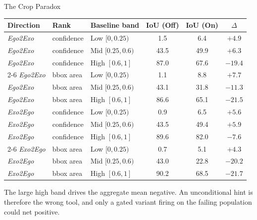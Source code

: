 \documentclass[professionalfonts,aspectratio=169]{beamer}
\begin{document}
\begin{frame}[t]
\begin{center}
{\large The Crop Paradox}
\end{center}
\vfill
\begin{center}
\footnotesize
\setlength{\tabcolsep}{5pt}
\begin{tabular}{lllccc}
  \toprule
  Direction & Rank & Baseline band & IoU (Off) & IoU (On) & $\Delta$ \\
  \midrule
  \textit{Ego2Exo} & confidence & Low $[0,0.25)$   & 1.5  & 6.4  & $+4.9$ \\
  \textit{Ego2Exo} & confidence & Mid $[0.25,0.6)$ & 43.5 & 49.9 & $+6.3$ \\
  \textit{Ego2Exo} & confidence & High $[0.6,1]$   & 87.0 & 67.6 & $-19.4$ \\
  \cmidrule(l){2-6}
  \textit{Ego2Exo} & bbox area  & Low $[0,0.25)$   & 1.1  & 8.8  & $+7.7$ \\
  \textit{Ego2Exo} & bbox area  & Mid $[0.25,0.6)$ & 43.1 & 31.8 & $-11.3$ \\
  \textit{Ego2Exo} & bbox area  & High $[0.6,1]$   & 86.6 & 65.1 & $-21.5$ \\
  \midrule
  \textit{Exo2Ego} & confidence & Low $[0,0.25)$   & 0.9  & 6.5  & $+5.6$ \\
  \textit{Exo2Ego} & confidence & Mid $[0.25,0.6)$ & 43.5 & 49.4 & $+5.9$ \\
  \textit{Exo2Ego} & confidence & High $[0.6,1]$   & 89.6 & 82.0 & $-7.6$ \\
  \cmidrule(l){2-6}
  \textit{Exo2Ego} & bbox area  & Low $[0,0.25)$   & 0.7  & 5.1  & $+4.3$ \\
  \textit{Exo2Ego} & bbox area  & Mid $[0.25,0.6)$ & 43.0 & 22.8 & $-20.2$ \\
  \textit{Exo2Ego} & bbox area  & High $[0.6,1]$   & 90.2 & 68.5 & $-21.7$ \\
  \bottomrule
\end{tabular}
\end{center}
\vspace{0.5em}
\begin{center}
\begin{minipage}{0.9\textwidth}
\small
The large high band drives the aggregate mean negative. An unconditional hint is therefore the wrong tool, and only a gated variant firing on the failing population could net positive.
\end{minipage}
\end{center}
\vfill
\end{frame}
\end{document}
